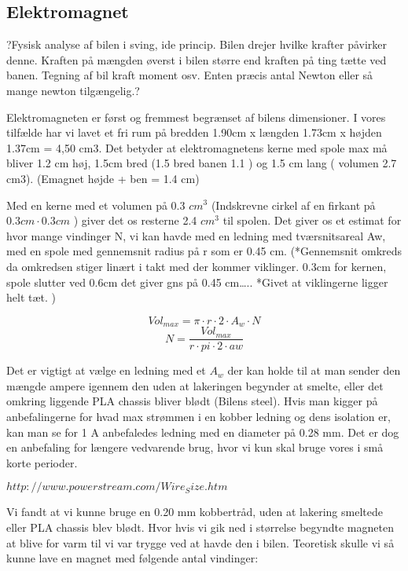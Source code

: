 
\subsection{Elektromagnet}
\label{Elektromagnet}
?Fysisk analyse af bilen i sving, ide princip. Bilen drejer hvilke krafter påvirker denne. Kraften på mængden øverst i bilen større end kraften på ting tætte ved banen. Tegning af bil kraft moment osv. Enten præcis antal Newton eller så mange newton tilgængelig.?

Elektromagneten er først og fremmest begrænset af bilens dimensioner. I vores tilfælde har vi lavet et fri rum på bredden 1.90cm x længden 1.73cm x højden 1.37cm = 4,50 cm3. 
Det betyder at elektromagnetens kerne med spole max må bliver 1.2 cm høj, 1.5cm bred (1.5  bred banen 1.1 ) og 1.5 cm lang ( volumen 2.7 cm3). (Emagnet højde + ben = 1.4 cm)

Med en kerne med et volumen på 0.3 $cm^3$ (Indskrevne cirkel af en firkant på $0.3cm \cdot 0.3 cm$ ) giver det os resterne 2.4 $cm^3$ til spolen.
Det giver os et estimat for hvor mange vindinger N, vi kan havde med en ledning med tværsnitsareal Aw, med en spole med gennemsnit radius på r som er 0.45 cm. (*Gennemsnit omkreds da omkredsen stiger linært i takt med der kommer viklinger. 0.3cm for kernen, spole slutter ved 0.6cm det giver gns på 0.45 cm….. *Givet at viklingerne ligger helt tæt. )


\begin{equation}
Vol_{max} =\pi \cdot r \cdot 2 \cdot A_w \cdot N 
\end{equation}
\begin{equation}
N= \frac{Vol_{max}}{r \cdot pi \cdot 2 \cdot aw}
\end{equation}

Det er vigtigt at vælge en ledning med et $A_{w}$ der kan holde til at man sender den mængde ampere igennem den uden at lakeringen begynder at smelte, eller det omkring liggende PLA chassis bliver blødt (Bilens steel). 
Hvis man kigger på anbefalingerne for hvad max strømmen i en kobber ledning og dens isolation er, kan man se for 1 A anbefaledes ledning med en diameter på 0.28 mm. Det er dog en anbefaling for længere vedvarende brug, hvor vi kun skal bruge vores i små korte perioder.

$http://www.powerstream.com/Wire_Size.htm $

Vi fandt at vi kunne bruge en 0.20 mm kobbertråd, uden at lakering smeltede eller PLA chassis blev blødt. Hvor hvis vi gik ned i størrelse begyndte magneten at blive for varm til vi var trygge ved at havde den i bilen.
Teoretisk skulle vi så kunne lave en magnet med følgende antal vindinger:

